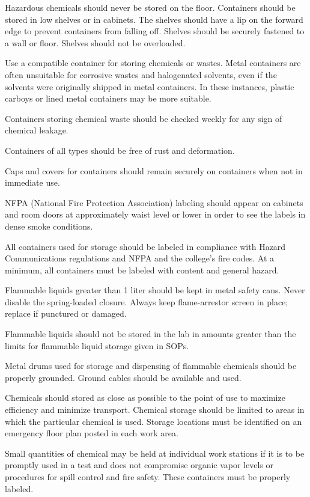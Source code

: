\documentclass[12pt]{../SOP3}\usepackage[]{graphicx}\usepackage[]{color}
\begin{document}
\NP Hazardous chemicals should never be stored on the floor. Containers should be stored in low shelves or in cabinets. The shelves should have a lip on the forward edge to prevent containers from falling off. Shelves should be securely fastened to a wall or floor. Shelves should not be overloaded.

\NP Use a compatible container for storing chemicals or wastes. Metal containers are often unsuitable for corrosive wastes and halogenated solvents, even if the solvents were originally shipped in metal containers. In these instances, plastic carboys or lined metal containers may be more suitable. 

\NP Containers storing chemical waste should be checked weekly for any sign of chemical leakage.

\NP Containers of all types should be free of rust and deformation. 

\NP Caps and covers for containers should remain securely on containers when not in immediate use.

\NP NFPA (National Fire Protection Association) labeling should appear on cabinets and room doors at approximately waist level or lower in order to see the labels in dense smoke conditions.

\NP All containers used for storage should be labeled in compliance with Hazard Communications regulations and NFPA and the college's fire codes. At a minimum, all containers must be labeled with content and general hazard.

\NP Flammable liquids greater than 1 liter should be kept in metal safety cans. Never disable the spring-loaded closure. Always keep flame-arrestor screen in place; replace if punctured or damaged. 

\NP Flammable liquids should not be stored in the lab in amounts greater than the limits for flammable liquid storage given in SOPs. 

\NP Metal drums used for storage and dispensing of flammable chemicals should be properly grounded. Ground cables should be available and used.

\NP Chemicals should stored as close as possible to the point of use to maximize efficiency and minimize transport. Chemical storage should be limited to areas in which the particular chemical is used. Storage locations must be identified on an emergency floor plan posted in each work area.

\NP Small quantities of chemical may be held at individual work stations if it is to be promptly used in a test and does not compromise organic vapor levels or procedures for spill control and fire safety. These containers must be properly labeled.
\end{document}
